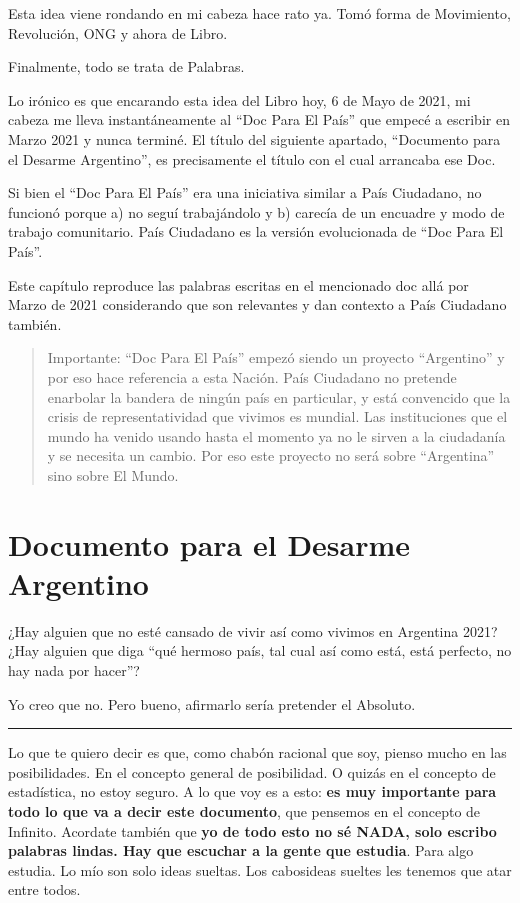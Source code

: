 \documentclass[
]{book}
\begin{document}
Esta idea viene rondando en mi cabeza hace rato ya. Tomó forma de Movimiento, Revolución, ONG y ahora de Libro.

Finalmente, todo se trata de Palabras.

Lo irónico es que encarando esta idea del Libro hoy, 6 de Mayo de 2021, mi cabeza me lleva instantáneamente al ``Doc Para El País'' que empecé a escribir en Marzo 2021 y nunca terminé. El título del siguiente apartado, ``Documento para el Desarme Argentino'', es precisamente el título con el cual arrancaba ese Doc.

Si bien el ``Doc Para El País'' era una iniciativa similar a País Ciudadano, no funcionó porque a) no seguí trabajándolo y b) carecía de un encuadre y modo de trabajo comunitario. País Ciudadano es la versión evolucionada de ``Doc Para El País''.

Este capítulo reproduce las palabras escritas en el mencionado doc allá por Marzo de 2021 considerando que son relevantes y dan contexto a País Ciudadano también.

\begin{quote}
Importante: ``Doc Para El País'' empezó siendo un proyecto ``Argentino'' y por eso hace referencia a esta Nación. País Ciudadano no pretende enarbolar la bandera de ningún país en particular, y está convencido que la crisis de representatividad que vivimos es mundial. Las instituciones que el mundo ha venido usando hasta el momento ya no le sirven a la ciudadanía y se necesita un cambio. Por eso este proyecto no será sobre ``Argentina'' sino sobre El Mundo.
\end{quote}

\hypertarget{documento-para-el-desarme-argentino}{%
\section{Documento para el Desarme Argentino}\label{documento-para-el-desarme-argentino}}

¿Hay alguien que no esté cansado de vivir así como vivimos en Argentina 2021? ¿Hay alguien que diga ``qué hermoso país, tal cual así como está, está perfecto, no hay nada por hacer''?

Yo creo que no. Pero bueno, afirmarlo sería pretender el Absoluto.

\begin{center}\rule{0.5\linewidth}{0.5pt}\end{center}

Lo que te quiero decir es que, como chabón racional que soy, pienso mucho en las posibilidades. En el concepto general de posibilidad. O quizás en el concepto de estadística, no estoy seguro. A lo que voy es a esto: \textbf{es muy importante para todo lo que va a decir este documento}, que pensemos en el concepto de Infinito. Acordate también que \textbf{yo de todo esto no sé NADA, solo escribo palabras lindas. Hay que escuchar a la gente que estudia}. Para algo estudia. Lo mío son solo ideas sueltas. Los cabosideas sueltes les tenemos que atar entre todos.
\end{document}
